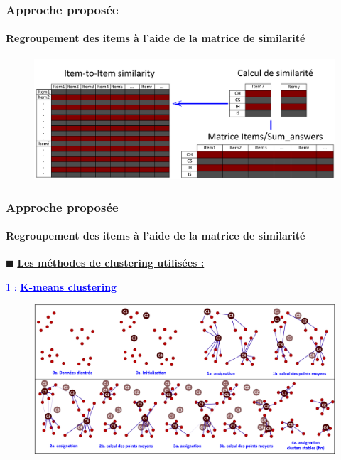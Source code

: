 \documentclass[aspectratio=169,professionalfonts, 12pt]{beamer}
\begin{document}
\begin{frame}
  \frametitle{Approche proposée}
  \framesubtitle{Regroupement des items à l’aide de la matrice de similarité}
  \justifying 
  \begin{minipage}{\textwidth}
    \begin{figure}[H]
      \begin{center}
        \includegraphics[scale=0.21]{images/contribution/similarity_compute.png}
      \end{center}
    \end{figure}
  \end{minipage}
\end{frame}

\begin{frame}
  \frametitle{Approche proposée}
  \framesubtitle{Regroupement des items à l’aide de la matrice de similarité}
  \(\displaystyle \blacksquare \) \textbf{\underline{Les méthodes de clustering utilisées :}} \\
  \justifying 
  \begin{minipage}{\textwidth}
    \vspace{2em}
  \hspace{3em} \textcolor{blue}{ 1 : \textbf{\underline{ K-means clustering}}}
  \end{minipage}
\end{frame}

\begin{frame}
  \justifying
  \begin{minipage}{\textwidth}
    \begin{figure}[H]
      \begin{center}
        \includegraphics[width=\textwidth]{images/contribution/kmeans_steps.png}
      \end{center}
      \label{kmeans_steps}
    \end{figure}
  \end{minipage}
\end{frame}
\end{document}
